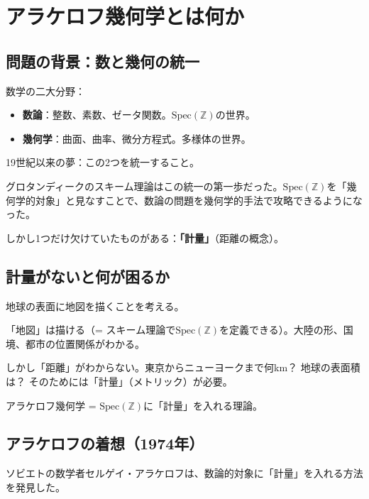 \documentclass[12pt,a4paper]{article}
\newcommand{\Spec}{\mathrm{Spec}}
\begin{document}
\section{アラケロフ幾何学とは何か}

\subsection{問題の背景：数と幾何の統一}

数学の二大分野：
\begin{itemize}
\item \textbf{数論}：整数、素数、ゼータ関数。$\Spec(\mathbb{Z})$の世界。
\item \textbf{幾何学}：曲面、曲率、微分方程式。多様体の世界。
\end{itemize}

19世紀以来の夢：この2つを統一すること。

グロタンディークのスキーム理論はこの統一の第一歩だった。$\Spec(\mathbb{Z})$を「幾何学的対象」と見なすことで、数論の問題を幾何学的手法で攻略できるようになった。

しかし1つだけ欠けていたものがある：\textbf{「計量」}（距離の概念）。

\subsection{計量がないと何が困るか}

\begin{storybox}[たとえ]
地球の表面に地図を描くことを考える。

「地図」は描ける（= スキーム理論で$\Spec(\mathbb{Z})$を定義できる）。大陸の形、国境、都市の位置関係がわかる。

しかし「距離」がわからない。東京からニューヨークまで何km？ 地球の表面積は？ そのためには「計量」（メトリック）が必要。

アラケロフ幾何学 = $\Spec(\mathbb{Z})$に「計量」を入れる理論。
\end{storybox}

\subsection{アラケロフの着想（1974年）}

ソビエトの数学者セルゲイ・アラケロフは、数論的対象に「計量」を入れる方法を発見した。
\end{document}

